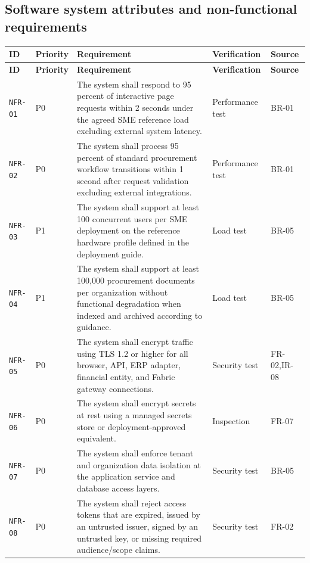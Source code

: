 \documentclass[11pt,a4paper]{article}
\begin{document}
\subsection{Software system attributes and non-functional requirements}\label{sec:nfr}
\begin{footnotesize}
\begin{longtable}{@{}p{}p{}p{}p{}p{}@{}}
\rowcolor{gray!18}\textbf{ID} & \textbf{Priority} & \textbf{Requirement} & \textbf{Verification} & \textbf{Source} \\ \hline
\endfirsthead
\rowcolor{gray!18}\textbf{ID} & \textbf{Priority} & \textbf{Requirement} & \textbf{Verification} & \textbf{Source} \\ \hline
\endhead
\texttt{NFR-01} & P0 & The system shall respond to 95 percent of interactive page requests within 2 seconds under the agreed SME reference load excluding external system latency. & Performance test & BR-01 \\ \hline
\texttt{NFR-02} & P0 & The system shall process 95 percent of standard procurement workflow transitions within 1 second after request validation excluding external integrations. & Performance test & BR-01 \\ \hline
\texttt{NFR-03} & P1 & The system shall support at least 100 concurrent users per SME deployment on the reference hardware profile defined in the deployment guide. & Load test & BR-05 \\ \hline
\texttt{NFR-04} & P1 & The system shall support at least 100,000 procurement documents per organization without functional degradation when indexed and archived according to guidance. & Load test & BR-05 \\ \hline
\texttt{NFR-05} & P0 & The system shall encrypt traffic using TLS 1.2 or higher for all browser, API, ERP adapter, financial entity, and Fabric gateway connections. & Security test & FR-02,IR-08 \\ \hline
\texttt{NFR-06} & P0 & The system shall encrypt secrets at rest using a managed secrets store or deployment-approved equivalent. & Inspection & FR-07 \\ \hline
\texttt{NFR-07} & P0 & The system shall enforce tenant and organization data isolation at the application service and database access layers. & Security test & BR-05 \\ \hline
\texttt{NFR-08} & P0 & The system shall reject access tokens that are expired, issued by an untrusted issuer, signed by an untrusted key, or missing required audience/scope claims. & Security test & FR-02 \\ \hline

\end{longtable}
\end{footnotesize}
\end{document}
